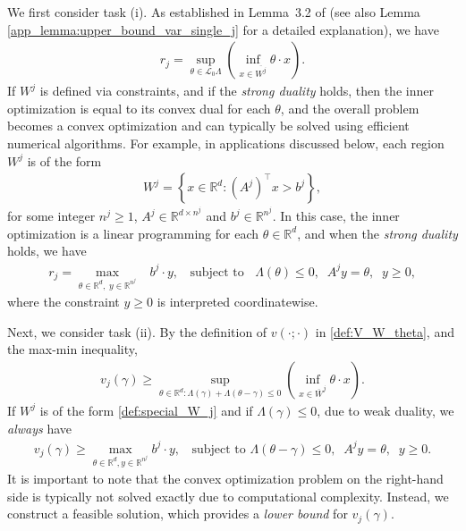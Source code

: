 \documentclass[aap,preprint]{imsart}
\newcommand{\bR}{{\mathbb{R}}}
\theoremstyle{plain}
\theoremstyle{definition}
\begin{document}
We first consider task (i). As established in Lemma~3.2 of \cite{collamore2002} (see also Lemma \ref{app_lemma:upper_bound_var_single_j} for a detailed explanation), we have
\begin{align}\label{def:r_j_alt}
    r_j = \sup_{\theta \in \mathcal{L}_0\Lambda} \left( \inf_{x \in \overline{W^j}} \theta \cdot x \right).
\end{align}
If $W^j$ is defined via constraints, and if the \textit{strong duality} holds, then the inner optimization is equal to its convex dual for each $\theta$, and the overall problem becomes a convex optimization and can typically be solved using efficient numerical algorithms.  For example, 
in applications discussed below, each region $W^j$ is of the form
\begin{align}
    \label{def:special_W_j}
W^j = \left\{x \in \mathbb{R}^d : (A^j)^\top x > b^j\right\},
\end{align}
for some integer $n^j \geq 1$, $A^j \in \bR^{d \times n^j}$ and $ b^j \in \bR^{n^j}$. In this case, the inner optimization is a linear programming for each $\theta \in \bR^d$, and when the \textit{strong duality} holds, we have
\begin{align*}
    r_j =  \max_{\theta \in \bR^d, \;y \in \bR^{n^j}} & b^j \cdot y,\;\; \text{ subject to }\;\;
    \Lambda(\theta) \leq 0,\;\; A^j y = \theta, \;\; y \geq 0,
\end{align*}
where the constraint $y \geq 0$ is interpreted coordinatewise. 

Next, we consider task (ii). By the definition of $v(\cdot;\cdot)$ in \eqref{def:V_W_theta}, and the max-min inequality,
\begin{align}\label{def:lower_bound_V_gamma}
    v_j(\gamma) \geq \sup_{\theta \in \bR^{d}: \Lambda(\gamma) + \Lambda(\theta -\gamma) \leq 0} \left( 
    \inf_{x \in \overline{W}^j} \theta \cdot x
    \right).
\end{align}
If $W^j$ is of the form \eqref{def:special_W_j} and if $\Lambda(\gamma) \leq 0$,  due to weak duality, we \emph{always} have 
\begin{align*}
    v_j(\gamma) \geq \max_{\theta \in \bR^{d}, y \in \bR^{n^j}}  b^j \cdot y,\;\; \text{ subject to }  \Lambda(\theta - \gamma) \leq 0,\;\; A^j y = \theta,\;\; y \geq 0.
\end{align*}
It is important to note that the convex optimization problem on the right-hand side is typically not solved exactly due to computational complexity. Instead, we construct a feasible solution, which provides a \textit{lower bound} for $v_j(\gamma)$.
\end{document}
